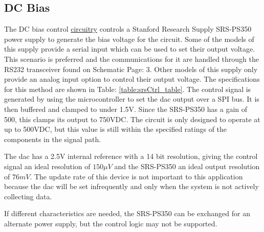 \subsection {DC Bias}
\label{sec:dcBias}

The DC bias control \hyperlink{sch:dcBias}{circuitry} controls a Stanford Research Supply SRS-PS350 power supply to generate the bias voltage for the circuit. Some of the models of this supply provide a serial input which can be used to set their output voltage. This scenario is preferred and the communications for it are handled through the RS232 transceiver found on Schematic Page: 3. Other models of this supply only provide an analog input option to control their output voltage. The specifications for this method are shown in Table: \ref{table:srsCtrl_table}. The control signal is generated by using the microcontroller to set the \gls{dac} output over a SPI bus. It is then buffered and clamped to under 1.5V. Since the SRS-PS350 has a gain of 500, this clamps its output to 750VDC. The circuit is only designed to operate at up to 500VDC, but this value is still within the specified ratings of the components in the signal path.



The \gls{dac} has a 2.5V internal reference with a 14 bit resolution, giving the control signal an ideal resolution of $150\mu V$ and the SRS-PS350 an ideal output resolution of $76mV$. The update rate of this device is not important to this application because the \gls{dac} will be set infrequently and only when the system is not actively collecting data.

If different characteristics are needed, the SRS-PS350 can be exchanged for an alternate power supply, but the control logic may not be supported.

